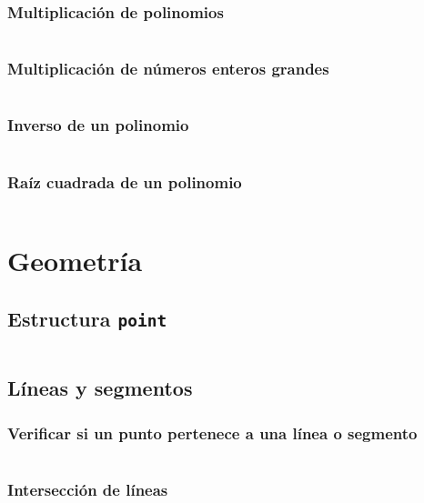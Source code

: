 \documentclass[11pt]{article}
\begin{document}
			\subsubsection{Multiplicación de polinomios}
			\inputminted[tabsize=2,breaklines,firstline=92,lastline=118,fontsize=\small]{c++}{fft.cpp}
			
			\subsubsection{Multiplicación de números enteros grandes}
			\inputminted[tabsize=2,breaklines,firstline=120,lastline=156,fontsize=\small]{c++}{fft.cpp}
			
			\subsubsection{Inverso de un polinomio}
			\inputminted[tabsize=2,breaklines,firstline=158,lastline=184,fontsize=\small]{c++}{fft.cpp}
			
			\subsubsection{Raíz cuadrada de un polinomio}
			\inputminted[tabsize=2,breaklines,firstline=186,lastline=208,fontsize=\small]{c++}{fft.cpp}
			
	\newpage
	\section{Geometría}
		\subsection{Estructura \texttt{point}}
		\inputminted[tabsize=2,breaklines,firstline=4,lastline=99,fontsize=\small]{c++}{geometry.cpp}
		
		\subsection{Líneas y segmentos}
			\subsubsection{Verificar si un punto pertenece a una línea o segmento}
			\inputminted[tabsize=2,breaklines,firstline=102,lastline=111,fontsize=\small]{c++}{geometry.cpp}
			
			\subsubsection{Intersección de líneas}
			\inputminted[tabsize=2,breaklines,firstline=113,lastline=133,fontsize=\small]{c++}{geometry.cpp}
			
\end{document}
